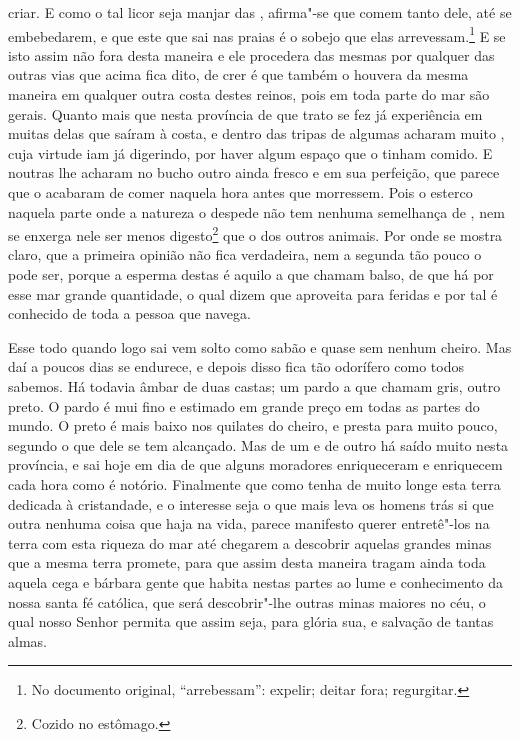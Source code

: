 criar. E como o tal licor seja manjar das , afirma"-se que comem
tanto dele, até se embebedarem, e que este que sai nas praias é o
sobejo que elas arrevessam.\footnote{ No documento original, ``arrebessam'': 
expelir; deitar fora; regurgitar.} E se isto assim não fora desta maneira e ele
procedera das mesmas  por qualquer das outras vias que acima fica
dito, de crer é que também o houvera da mesma maneira em qualquer
outra costa destes reinos, pois em toda parte do mar são gerais. Quanto
mais que nesta província de que trato se fez já experiência em muitas
delas que saíram à costa, e dentro das tripas de algumas acharam muito
, cuja virtude iam já digerindo, por haver algum espaço que o
tinham comido. E noutras lhe acharam no bucho outro ainda fresco e em
sua perfeição, que parece que o acabaram de comer naquela hora antes
que morressem. Pois o esterco naquela parte onde a natureza o despede
não tem nenhuma semelhança de , nem se enxerga nele ser menos
digesto\footnote{ Cozido no estômago.} que o dos outros animais. Por
onde se mostra claro, que a primeira opinião não fica verdadeira, nem a
segunda tão pouco o pode ser, porque a esperma destas  é aquilo
a que chamam balso, de que há por esse mar grande quantidade, o qual
dizem que aproveita para feridas e por tal é conhecido de toda a pessoa que navega. 

Esse  todo quando logo sai vem solto como sabão e quase sem nenhum
cheiro. Mas daí a poucos dias se endurece, e depois disso fica tão
odorífero como todos sabemos. Há todavia âmbar de duas castas; um
pardo a que chamam gris, outro preto. O pardo é mui fino e estimado em
grande preço em todas as partes do mundo. O preto é mais baixo nos
quilates do cheiro, e presta para muito pouco, segundo o que dele se tem
alcançado. Mas de um e de outro há saído muito nesta província, e sai
hoje em dia de que alguns moradores enriqueceram e enriquecem cada
hora como é notório. Finalmente que como  tenha de muito longe esta
terra dedicada à cristandade, e o interesse seja o que mais leva os
homens trás si que outra nenhuma coisa que haja na vida, parece
manifesto querer entretê"-los na terra com esta riqueza do mar até
chegarem a descobrir aquelas grandes minas que a mesma terra promete,
para que assim desta maneira tragam ainda toda aquela cega e bárbara
gente que habita nestas partes ao lume e conhecimento da nossa santa				%
fé católica, que será descobrir"-lhe outras minas maiores no céu, o qual
nosso Senhor permita que assim seja, para glória sua, e salvação de
tantas almas.

